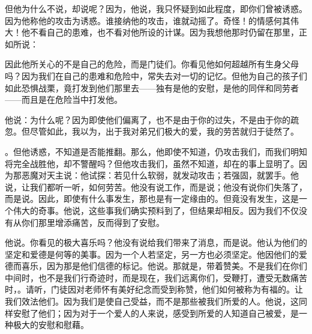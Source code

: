 但他为什么不说，却说呢？因为，他说，我只怀疑到如此程度，即你们曾被诱惑。因为他称他的攻击为诱惑。谁接纳他的攻击，谁就动摇了。奇怪！的情感何其伟大！他不看自己的患难，也不看对他所设的计谋。因为我想他那时仍留在那里，正如所说：\par

因此他所关心的不是自己的危险，而是门徒们。你看见他如何超越所有生身父母吗？因为我们在自己的患难和危险中，常失去对一切的记忆。但他为自己的孩子们如此恐惧战栗，竟打发到他们那里去——独有是他的安慰，是他的同伴和同劳者——而且是在危险当中打发他。\par

他说：为什么呢？因为即使他们偏离了，也不是由于你的过失，不是由于你的疏忽。但尽管如此，我以为，出于我对弟兄们极大的爱，我的劳苦就归于徒然了。\par

。但他诱惑，不知道是否能推翻。那么，他即使不知道，仍攻击我们，而我们明知将完全战胜他，却不警醒吗？但他攻击我们，虽然不知道，却在的事上显明了。因为那恶魔对天主说：他试探：若见什么软弱，就发动攻击；若强固，就罢手。他说，让我们都听一听，如何劳苦。他没有说工作，而是说；他没有说你们失落了，而是说。因此，即使有什么事发生，那也是有一定缘由的。但竟没有发生，这是一个伟大的奇事。他说，这些事我们确实预料到了，但结果却相反。因为我们不仅没有从你们那里增添痛苦，反而得到了安慰。\par

 他说。你看见的极大喜乐吗？他没有说给我们带来了消息，而是说。他认为他们的坚定和爱德是何等的美事。因为一个人若坚定，另一方也必须坚定。他因他们的爱德而喜乐，因为那是他们信德的标记。他说。那就是，带着赞美。不是我们在你们中间时，也不是我们行奇迹时，而是现在，我们远离你们，受鞭打，遭受无数痛苦时，。请听，门徒因对老师怀有美好纪念而受到称赞，他们如何被称为有福的。让我们效法他们。因为我们是使自己受益，而不是那些被我们所爱的人。他说，这同样安慰了他们；因为对于一个爱人的人来说，感受到所爱的人知道自己被爱，是一种极大的安慰和慰藉。\par

